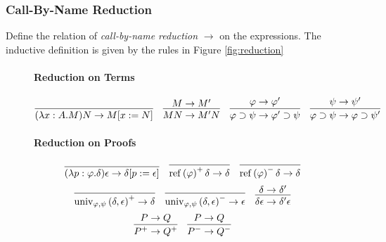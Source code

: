 \documentclass[a4paper,UKenglish]{lipics-v2016}
\newcommand*{\reff}[1]{\ensuremath{\mathrm{ref} \left( {#1} \right)}}
\newcommand*{\univ}[4]{\ensuremath{\mathrm{univ}_{{#1}, {#2}} \left({#3} , {#4} \right)}}
\theoremstyle{plain}
\theoremstyle{definition}
\begin{document}
\subsubsection{Call-By-Name Reduction}

\begin{definition}
Define the relation of \emph{call-by-name reduction} $\rightarrow$ on the expressions.  The inductive
definition is given by the rules in Figure \ref{fig:reduction}

\begin{figure}
\paragraph*{Reduction on Terms}
$$ \infer{(\lambda x:A.M)N \rightarrow M[x:=N]}{} \quad
\infer{MN \rightarrow M'N}{M \rightarrow M'} \quad
\infer{\varphi \supset \psi \rightarrow \varphi' \supset \psi}{\varphi \rightarrow \varphi'} \quad
\infer{\varphi \supset \psi \rightarrow \varphi \supset \psi'}{\psi \rightarrow \psi'} $$
\paragraph*{Reduction on Proofs}
$$\infer{(\lambda p : \varphi . \delta)\epsilon \rightarrow \delta [ p := \epsilon ]}{} \quad
\infer{\reff{\varphi}^+ \delta \rightarrow \delta}{} \quad
\infer{\reff{\varphi}^- \delta \rightarrow \delta}{} $$
$$ \infer{\univ{\varphi}{\psi}{\delta}{\epsilon}^+ \rightarrow \delta}{} \quad
\infer{\univ{\varphi}{\psi}{\delta}{\epsilon}^- \rightarrow \epsilon}{} \quad
\infer{\delta \epsilon \rightarrow \delta' \epsilon}{\delta \rightarrow \delta'} $$
$$ \infer{P^+ \rightarrow Q^+}{P \rightarrow Q} \quad
\infer{P^- \rightarrow Q^-}{P \rightarrow Q}$$

\end{figure}
\end{definition}
\end{document}
